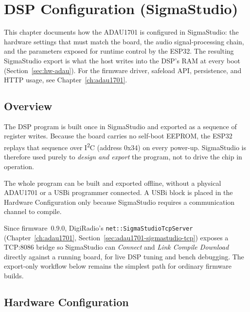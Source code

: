 \chapter{DSP Configuration (SigmaStudio)}
\label{ch:sigmastudio}

This chapter documents how the ADAU1701 is configured in SigmaStudio: the
hardware settings that must match the board, the audio signal-processing
chain, and the parameters exposed for runtime control by the ESP32. The
resulting SigmaStudio export is what the host writes into the DSP's RAM at
every boot (Section~\ref{sec:hw-adau}). For the firmware driver, safeload
API, persistence, and HTTP usage, see Chapter~\ref{ch:adau1701}.

\section{Overview}
\label{sec:ss-overview}

The DSP program is built once in SigmaStudio and exported as a sequence of
register writes. Because the board carries no self-boot EEPROM, the ESP32
replays that sequence over I\textsuperscript{2}C (address 0x34) on every
power-up. SigmaStudio is therefore used purely to \emph{design and export}
the program, not to drive the chip in operation.

\begin{drkey}
The whole program can be built and exported offline, without a physical
ADAU1701 or a USBi programmer connected. A USBi block is placed in the
Hardware Configuration only because SigmaStudio requires a communication
channel to compile.
\end{drkey}

\begin{drref}
Since firmware~0.9.0, DigiRadio's \texttt{net::SigmaStudioTcpServer}
(Chapter~\ref{ch:adau1701}, Section~\ref{sec:adau1701-sigmastudio-tcp})
exposes a TCP:8086 bridge so SigmaStudio can \emph{Connect} and
\emph{Link Compile Download} directly against a running board, for live DSP
tuning and bench debugging. The export-only workflow below remains the
simplest path for ordinary firmware builds.
\end{drref}

\section{Hardware Configuration}
\label{sec:ss-hwcfg}

